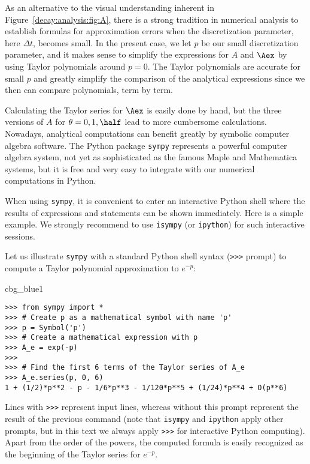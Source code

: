 \documentclass[graybox,sectrefs,envcountresetchap,open=right,final]{svmonodo}
\newenvironment{_cod_tight}[1]{
   \def\FrameCommand{\colorbox{#1}}
   \FrameRule0.6pt\MakeFramed {\FrameRestore}\vskip3mm}
   {\vskip0mm\endMakeFramed}
\newenvironment{cod}[1]{
\bgroup\rmfamily
\fboxsep=0mm\relax
\begin{_cod_tight}{#1}
\list{}{\parsep=-2mm\parskip=0mm\topsep=0pt\leftmargin=2mm
\rightmargin=2\leftmargin\leftmargin=4pt\relax}
\item\relax}
{\endlist\end{_cod_tight}\egroup}
\begin{document}
As an alternative to the visual understanding inherent in Figure~\ref{decay:analysis:fig:A}, there is a strong tradition in numerical
analysis to establish formulas for approximation errors when the
discretization parameter, here $\Delta t$, becomes small. In the
present case, we let $p$ be our small discretization parameter, and it
makes sense to simplify the expressions for $A$ and $\Aex$ by using
Taylor polynomials around $p=0$.  The Taylor polynomials are accurate
for small $p$ and greatly simplify the comparison of the analytical
expressions since we then can compare polynomials, term by term.

Calculating the Taylor series for $\Aex$ is easily done by hand, but
the three versions of $A$ for $\theta=0,1,{\half}$ lead to more
cumbersome calculations.
Nowadays, analytical computations can benefit greatly by
symbolic computer algebra software. The Python package \texttt{sympy}
represents a powerful computer algebra system, not yet as sophisticated as
the famous Maple and Mathematica systems, but it is free and
very easy to integrate with our numerical computations in Python.


When using \texttt{sympy}, it is convenient to enter an interactive Python
shell where the results of expressions and statements can be shown
immediately.
Here is a simple example. We strongly recommend to use
\texttt{isympy} (or \texttt{ipython}) for such interactive sessions.

Let us illustrate \texttt{sympy} with a standard Python shell syntax
(\texttt{>>>} prompt) to compute a Taylor polynomial approximation to $e^{-p}$:

\begin{cod}{cbg_blue1}\begin{Verbatim}[numbers=none,fontsize=\fontsize{9pt}{9pt},baselinestretch=0.95,xleftmargin=2mm]
>>> from sympy import *
>>> # Create p as a mathematical symbol with name 'p'
>>> p = Symbol('p')
>>> # Create a mathematical expression with p
>>> A_e = exp(-p)
>>>
>>> # Find the first 6 terms of the Taylor series of A_e
>>> A_e.series(p, 0, 6)
1 + (1/2)*p**2 - p - 1/6*p**3 - 1/120*p**5 + (1/24)*p**4 + O(p**6)
\end{Verbatim}
\end{cod}
\noindent
Lines with \texttt{>>>} represent input lines, whereas without
this prompt represent the result of the previous command (note that
\texttt{isympy} and \texttt{ipython} apply other prompts, but in this text
we always apply \texttt{>>>} for interactive Python computing).
Apart from the order of the powers, the computed formula is easily
recognized as the beginning of the Taylor series for $e^{-p}$.
\end{document}
